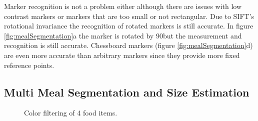 Marker recognition is not a problem either although there are issues with low contrast markers or markers that are too small or not rectangular. Due to SIFT's rotational invariance the recognition of rotated markers is still accurate. In figure \ref{fig:mealSegmentation}a the marker is rotated by 90\degree but the measurement and recognition is still accurate. Chessboard markers {(figure \ref{fig:mealSegmentation}d)} are even more accurate than arbitrary markers since they provide more fixed reference points.

\subsection{Multi Meal Segmentation and Size Estimation}
\begin{figure}[htb]
	\centering
	\hspace{\fill}%
	\hspace{\fill}%
	\hspace{\fill}%
	\hspace{\fill}%
	\hspace{\fill}%
	\caption{Color filtering of 4 food items.}
	\label{fig:foodItemSegmentation}
\end{figure}
